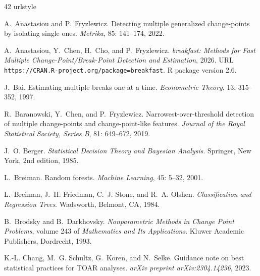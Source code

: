 \documentclass[12pt, a4paper]{article}
\begin{document}
\begin{thebibliography}{42}
\providecommand{\natexlab}[1]{#1}
\providecommand{\url}[1]{\texttt{#1}}
\expandafter\ifx\csname urlstyle\endcsname\relax
  \providecommand{\doi}[1]{doi: #1}\else
  \providecommand{\doi}{doi: \begingroup \urlstyle{rm}\Url}\fi

A.~Anastasiou and P.~Fryzlewicz.
\newblock Detecting multiple generalized change-points by isolating single
  ones.
\newblock \emph{Metrika}, 85: 141--174, 2022.

A.~Anastasiou, Y.~Chen, H.~Cho, and P.~Fryzlewicz.
\newblock \emph{breakfast: Methods for Fast Multiple Change-Point/Break-Point
  Detection and Estimation}, 2026.
\newblock URL \url{https://CRAN.R-project.org/package=breakfast}.
\newblock R package version 2.6.

J.~Bai.
\newblock Estimating multiple breaks one at a time.
\newblock \emph{Econometric Theory}, 13: 315--352, 1997.

R.~Baranowski, Y.~Chen, and P.~Fryzlewicz.
\newblock Narrowest-over-threshold detection of multiple change-points and
  change-point-like features.
\newblock \emph{Journal of the Royal Statistical Society, Series B},
  81: 649--672, 2019.

J.~O. Berger.
\newblock \emph{Statistical Decision Theory and {B}ayesian Analysis}.
\newblock Springer, New York, 2nd edition, 1985.

L.~Breiman.
\newblock Random forests.
\newblock \emph{Machine Learning}, 45: 5--32, 2001.

L.~Breiman, J.~H. Friedman, C.~J. Stone, and R.~A. Olshen.
\newblock \emph{Classification and Regression Trees}.
\newblock Wadsworth, Belmont, CA, 1984.

B.~Brodsky and B.~Darkhovsky.
\newblock \emph{Nonparametric Methods in Change Point Problems}, volume 243 of
  \emph{Mathematics and Its Applications}.
\newblock Kluwer Academic Publishers, Dordrecht, 1993.

K.-L. Chang, M.~G. Schultz, G.~Koren, and N.~Selke.
\newblock Guidance note on best statistical practices for {TOAR} analyses.
\newblock \emph{arXiv preprint arXiv:2304.14236}, 2023.


\end{thebibliography}
\end{document}
